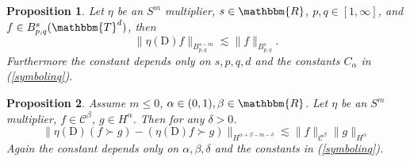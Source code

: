 \documentclass[11pt, oneside]{article}   	%
\newcommand{\mathD}{\mathrm{D}}
\newtheorem{proposition}{Proposition}
{\theorembodyfont{\rmfamily}\newtheorem{remark}{Remark}}
\newcommand{\VV}{\mathscr{C}}
\begin{document}
\begin{proposition}
  \label{multiplierestimate}Let $\eta$ be an $S^m$ multiplier, $s \in
  \mathbbm{R}$, $p, q \in [1, \infty]$, and $f \in B_{p, q}^s
  (\mathbbm{T}^d)$, then
  \[ \| \eta (\mathD) f \|_{B_{p, q}^{s - m}} \lesssim \| f \|_{B_{p, q}^s} .
  \]
  Furthermore the constant depends only on $s, p, q, d$ and the constants
  $C_{\alpha}$ in (\ref{symbolinq}).
\end{proposition}

\begin{proposition}
  \label{paraproductleibniz}Assume $m \leqslant 0$, $\alpha \in (0, 1), \beta
  \in \mathbbm{R}$. Let $\eta$ be an $S^m$ multiplier, $f \in \VV^{\beta}$, $g
  \in H^{\alpha}$. Then for any $\delta > 0$.
  \[ \| \eta (\mathD) (f \succ g) - (\eta (\mathD) f \succ g) \|_{H^{\alpha +
     \beta - m - \delta}} \lesssim \| f \|_{\VV^{\beta}} \| g \|_{H^{\alpha}}
  \]
  Again the constant depends only on $\alpha, \beta, \delta$ and the constants
  in (\ref{symbolinq}).
\end{proposition}
\end{document}
